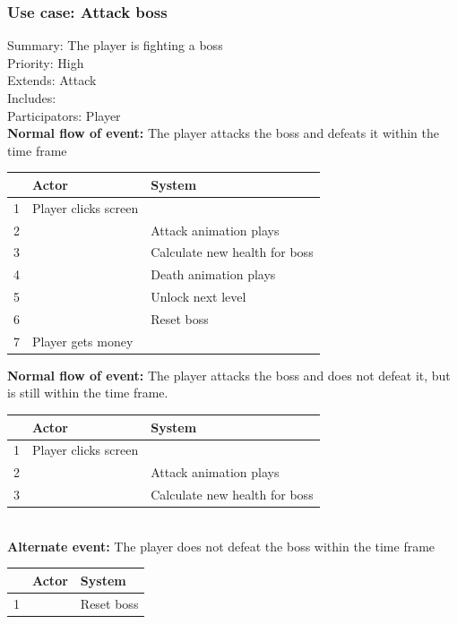 \documentclass{article}
\begin{document}
\subsubsection{Use case: Attack boss}
Summary: The player is fighting a boss \\
Priority: High \\
Extends: Attack\\
Includes: \\
Participators: Player \\
\textbf{Normal flow of event:} The player attacks the boss and defeats it within the time frame 
\vspace{1 mm}\\
\begin{tabular}{|c|l|l|} \hline
    & Actor & System \\ \hline
    1 & Player clicks screen & \\ \hline
    2 & & Attack animation plays \\ \hline
    3 & & Calculate new health for boss \\ \hline
    4 & & Death animation plays \\ \hline
    5 & & Unlock next level \\ \hline
    6 & & Reset boss \\ \hline
    7 & Player gets money & \\ \hline
\end{tabular}
\newpage
\noindent
\textbf{Normal flow of event:} The player attacks the boss and does not defeat it, but is still within the time frame. 
\vspace{1 mm}\\
\begin{tabular}{|c|l|l|} \hline
    & Actor & System \\ \hline
    1 & Player clicks screen & \\ \hline
    2 & & Attack animation plays \\ \hline
    3 & & Calculate new health for boss \\ \hline
\end{tabular}
\vspace{5 mm}\\
\textbf{Alternate event:} The player does not defeat the boss within the time frame 
\vspace{1 mm}\\
\begin{tabular}{|c|l|l|} \hline
    & Actor & System \\ \hline
    1 & & Reset boss \\ \hline
\end{tabular}
\end{document}

